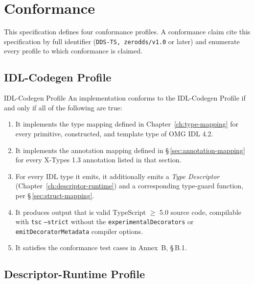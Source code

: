 \documentclass{../styles/zerodds-vendor-spec}
\begin{document}
\chapter{Conformance}\label{ch:conformance}

This specification defines four conformance profiles. A
conformance claim  cite this specification by full
identifier (\texttt{DDS-TS, zerodds/v1.0} or later) and
enumerate every profile to which conformance is claimed.

\section{IDL-Codegen Profile}\label{sec:profile-codegen}

\begin{conformance}{IDL-Codegen Profile}
An implementation conforms to the IDL-Codegen Profile if and only
if all of the following are true:
\begin{enumerate}
  \item It implements the type mapping defined in
        Chapter~\ref{ch:type-mapping} for every primitive,
        constructed, and template type of OMG IDL 4.2.
  \item It implements the annotation mapping defined in
        \S\,\ref{sec:annotation-mapping} for every X-Types 1.3
        annotation listed in that section.
  \item For every IDL type it emits, it additionally emits a
        \emph{Type Descriptor} (Chapter~\ref{ch:descriptor-runtime})
        and a corresponding type-guard function, per
        \S\,\ref{sec:struct-mapping}.
  \item It produces output that is valid TypeScript $\geq$ 5.0
        source code, compilable with \texttt{tsc} \texttt{--strict}
        without the \texttt{experimentalDecorators} or
        \texttt{emitDecoratorMetadata} compiler options.
  \item It satisfies the conformance test cases in Annex~B,
        \S\,B.1.
\end{enumerate}
\end{conformance}

\section{Descriptor-Runtime Profile}\label{sec:profile-runtime}
\end{document}
